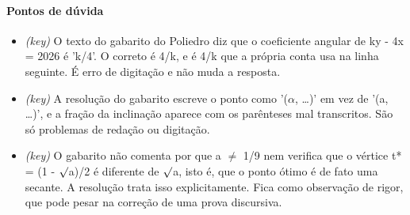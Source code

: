 \documentclass{article}%
\begin{document}
\paragraph{Pontos de dúvida}%
\begin{itemize}%
\item%
\textit{(key)} O texto do gabarito do Poliedro diz que o coeficiente angular de ky - 4x = 2026 é 'k/4'. O correto é 4/k, e é 4/k que a própria conta usa na linha seguinte. É erro de digitação e não muda a resposta.%
\item%
\textit{(key)} A resolução do gabarito escreve o ponto como '($\alpha$, \ldots{})' em vez de '(a, \ldots{})', e a fração da inclinação aparece com os parênteses mal transcritos. São só problemas de redação ou digitação.%
\item%
\textit{(key)} O gabarito não comenta por que a $\neq$ 1/9 nem verifica que o vértice t* = (1 - $\surd$a)/2 é diferente de $\surd$a, isto é, que o ponto ótimo é de fato uma secante. A resolução trata isso explicitamente. Fica como observação de rigor, que pode pesar na correção de uma prova discursiva.%
\end{itemize}%
\end{document}

